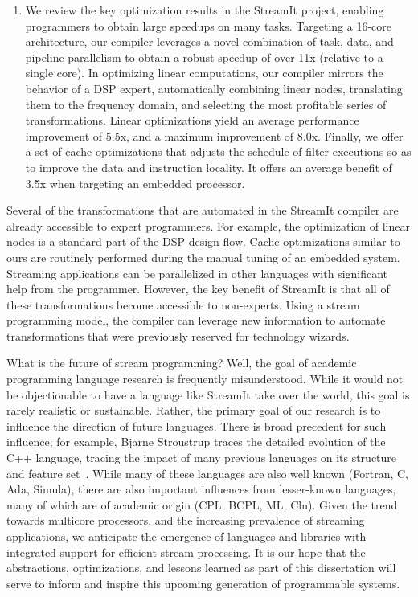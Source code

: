 \begin{enumerate}
\item We review the key optimization results in the StreamIt project, 
enabling programmers to obtain large speedups on many tasks.
Targeting a 16-core architecture, our compiler leverages a novel
combination of task, data, and pipeline parallelism to obtain a robust
speedup of over 11x (relative to a single core).  In optimizing linear
computations, our compiler mirrors the behavior of a DSP expert,
automatically combining linear nodes, translating them to the
frequency domain, and selecting the most profitable series of
transformations.  Linear optimizations yield an average performance
improvement of 5.5x, and a maximum improvement of 8.0x.  Finally, we
offer a set of cache optimizations that adjusts the schedule of filter
executions so as to improve the data and instruction locality.  It
offers an average benefit of 3.5x when targeting an embedded
processor.

\end{enumerate}

Several of the transformations that are automated in the StreamIt
compiler are already accessible to expert programmers.  For example,
the optimization of linear nodes is a standard part of the DSP design
flow.  Cache optimizations similar to ours are routinely performed
during the manual tuning of an embedded system.  Streaming
applications can be parallelized in other languages with significant
help from the programmer.  However, the key benefit of StreamIt is
that all of these transformations become accessible to non-experts.
Using a stream programming model, the compiler can leverage new
information to automate transformations that were previously reserved
for technology wizards.

What is the future of stream programming?  Well, the goal of academic
programming language research is frequently misunderstood.  While it
would not be objectionable to have a language like StreamIt take over
the world, this goal is rarely realistic or sustainable.  Rather, the
primary goal of our research is to influence the direction of future
languages.  There is broad precedent for such influence; for example,
Bjarne Stroustrup traces the detailed evolution of the C++ language,
tracing the impact of many previous languages on its structure and
feature set~\cite{stroustrup_design_1994}.  While many of these
languages are also well known (Fortran, C, Ada, Simula), there are
also important influences from lesser-known languages, many of which
are of academic origin (CPL, BCPL, ML, Clu).  Given the trend towards
multicore processors, and the increasing prevalence of streaming
applications, we anticipate the emergence of languages and libraries
with integrated support for efficient stream processing.  It is our
hope that the abstractions, optimizations, and lessons learned as part
of this dissertation will serve to inform and inspire this upcoming
generation of programmable systems.


